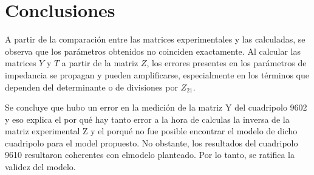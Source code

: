 \section{Conclusiones}
A partir de la comparación entre las matrices experimentales y las calculadas, se observa que los parámetros obtenidos no coinciden exactamente. Al calcular las matrices $Y$ y $T$ a partir de la matriz $Z$, los errores presentes en los parámetros de impedancia se propagan y pueden amplificarse, especialmente en los términos que dependen del determinante o de divisiones por $Z_{21}$.

    Se concluye que hubo un error en la medición de la matriz Y del cuadripolo 9602 y eso explica el por qué hay tanto error a la hora de calculas la inversa de la matriz experimental Z y el porqué no fue posible encontrar el modelo de dicho cuadripolo para el model propuesto. No obstante, los resultados del cuadripolo 9610 resultaron coherentes con elmodelo planteado. Por lo tanto, se ratifica la validez del modelo. 
